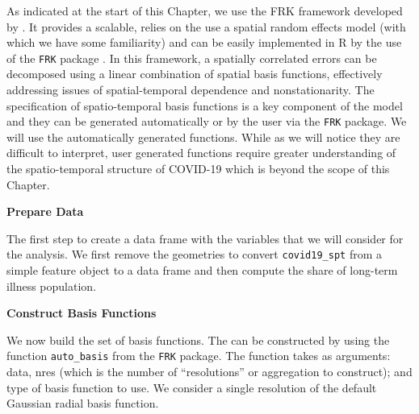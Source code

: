 \documentclass[
]{book}
\newenvironment{Shaded}{\begin{snugshade}}{\end{snugshade}}
\newcommand{\CommentTok}[1]{\textcolor[rgb]{0.56,0.35,0.01}{\textit{#1}}}
\newcommand{\DataTypeTok}[1]{\textcolor[rgb]{0.13,0.29,0.53}{#1}}
\newcommand{\KeywordTok}[1]{\textcolor[rgb]{0.13,0.29,0.53}{\textbf{#1}}}
\newcommand{\NormalTok}[1]{#1}
\newcommand{\OperatorTok}[1]{\textcolor[rgb]{0.81,0.36,0.00}{\textbf{#1}}}
\newcommand{\OtherTok}[1]{\textcolor[rgb]{0.56,0.35,0.01}{#1}}
\newcommand{\StringTok}[1]{\textcolor[rgb]{0.31,0.60,0.02}{#1}}
\begin{document}
As indicated at the start of this Chapter, we use the FRK framework developed by \citet{cressie2008fixed}. It provides a scalable, relies on the use a spatial random effects model (with which we have some familiarity) and can be easily implemented in R by the use of the \texttt{FRK} package \citep{zammit2017frk}. In this framework, a spatially correlated errors can be decomposed using a linear combination of spatial basis functions, effectively addressing issues of spatial-temporal dependence and nonstationarity. The specification of spatio-temporal basis functions is a key component of the model and they can be generated automatically or by the user via the \texttt{FRK} package. We will use the automatically generated functions. While as we will notice they are difficult to interpret, user generated functions require greater understanding of the spatio-temporal structure of COVID-19 which is beyond the scope of this Chapter.

\textbf{Prepare Data}

The first step to create a data frame with the variables that we will consider for the analysis. We first remove the geometries to convert \texttt{covid19\_spt} from a simple feature object to a data frame and then compute the share of long-term illness population.

\begin{Shaded}
\end{Shaded}

\textbf{Construct Basis Functions}

We now build the set of basis functions. The can be constructed by using the function \texttt{auto\_basis} from the \texttt{FRK} package. The function takes as arguments: data, nres (which is the number of ``resolutions'' or aggregation to construct); and type of basis function to use. We consider a single resolution of the default Gaussian radial basis function.
\end{document}
